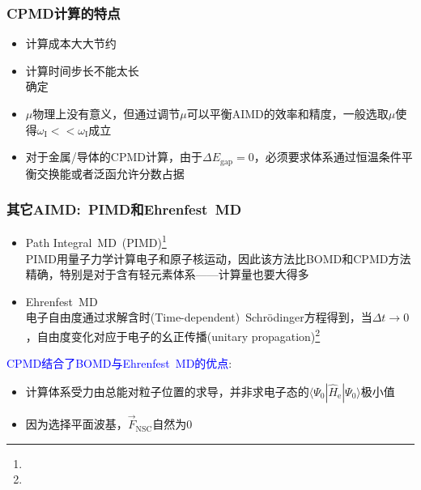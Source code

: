 \frame
{
	\frametitle{\textrm{CPMD}计算的特点}
	\begin{itemize}
		\item 计算成本大大节约\\
			{\fontsize{8.2pt}{4.2pt}}
		\item 计算时间步长不能太长\\
			{\fontsize{8.2pt}{4.2pt}}确定
		\item $\mu$物理上没有意义，但通过调节$\mu$可以平衡\textrm{AIMD}的效率和精度，一般选取$\mu$使得$\omega_{\mathrm{I}}<<\omega_{\mathrm{I}}$成立
		\item 对于金属/导体的\textrm{CPMD}计算，由于$\Delta E_{\mathrm{gap}}=0$，必须要求体系通过恒温条件平衡交换能或者泛函允许分数占据
		\end{itemize}
}

\frame
{
	\frametitle{其它\textrm{AIMD}:~\textrm{PIMD}和\textrm{Ehrenfest~MD}}
	\begin{itemize}
		\item \textrm{Path Integral~MD~(PIMD)}\footnote{\fontsize{6.2pt}{4.2pt}}\\
			\textrm{PIMD}用量子力学计算电子和原子核运动，因此该方法比\textrm{BOMD}和\textrm{CPMD}方法精确，特别是对于含有轻元素体系——计算量也要大得多
		\item \textrm{Ehrenfest~MD}\\
			电子自由度通过求解含时\textrm{(Time-dependent)~Schr\"odinger}方程得到，当$\Delta t\rightarrow0$，自由度变化对应于电子的幺正传播\textrm{(unitary propagation)}\footnote{\fontsize{6.2pt}{4.2pt}}
	\end{itemize}
	\textcolor{blue}{\textrm{CPMD}结合了\textrm{BOMD}与\textrm{Ehrenfest~MD}的优点}:
	\begin{itemize}
		\item 计算体系受力由总能对粒子位置的求导，并非求电子态的$\langle\Psi_0|\hat H_{\mathrm{e}}|\Psi_0\rangle$极小值
		\item 因为选择平面波基，$\vec F_{\mathrm{NSC}}$自然为0
	\end{itemize}
}

